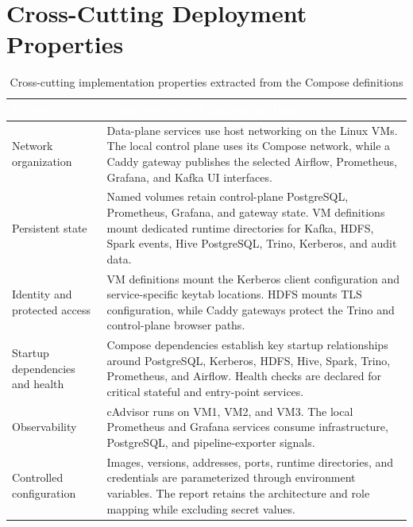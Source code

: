 \section{Cross-Cutting Deployment Properties}

\begin{table}[H]
    \centering
    \footnotesize
    \renewcommand{\arraystretch}{1.14}
    \begin{tabularx}{\textwidth}{|L{3.4cm}|Y|}
        \hline
        \textcolor{white}{\textbf{Property}} & \textcolor{white}{\textbf{Compose-derived implementation}} \\
        \hline
        Network organization & Data-plane services use host networking on the Linux VMs. The local control plane uses its Compose network, while a Caddy gateway publishes the selected Airflow, Prometheus, Grafana, and Kafka UI interfaces. \\
        \hline
        Persistent state & Named volumes retain control-plane PostgreSQL, Prometheus, Grafana, and gateway state. VM definitions mount dedicated runtime directories for Kafka, HDFS, Spark events, Hive PostgreSQL, Trino, Kerberos, and audit data. \\
        \hline
        Identity and protected access & VM definitions mount the Kerberos client configuration and service-specific keytab locations. HDFS mounts TLS configuration, while Caddy gateways protect the Trino and control-plane browser paths. \\
        \hline
        Startup dependencies and health & Compose dependencies establish key startup relationships around PostgreSQL, Kerberos, HDFS, Hive, Spark, Trino, Prometheus, and Airflow. Health checks are declared for critical stateful and entry-point services. \\
        \hline
        Observability & cAdvisor runs on VM1, VM2, and VM3. The local Prometheus and Grafana services consume infrastructure, PostgreSQL, and pipeline-exporter signals. \\
        \hline
        Controlled configuration & Images, versions, addresses, ports, runtime directories, and credentials are parameterized through environment variables. The report retains the architecture and role mapping while excluding secret values. \\
        \hline
    \end{tabularx}
    \caption{Cross-cutting implementation properties extracted from the Compose definitions}
    \label{tab:appendix-compose-properties}
\end{table}
\FloatBarrier
